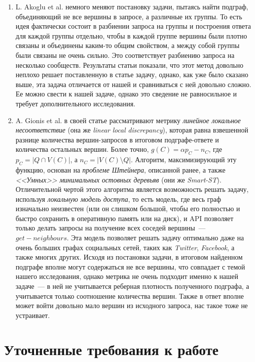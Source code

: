 \begin{enumerate}
  \item L. Akoglu et al. \cite{Akoglu13} немного меняют постановку задачи, пытаясь найти подграф, объединяющий не все вершины в запросе, а различные их группы. То есть идея фактически состоит в разбиении запроса на группы и построения ответа для каждой группы отдельно, чтобы в каждой группе вершины были плотно связаны и объединены каким-то общим свойством, а между собой группы были связаны не очень сильно. Это соответствует разбиению запроса на несколько сообществ. Результаты статьи показали, что этот метод довольно неплохо решает поставленную в статье задачу, однако, как уже было сказано выше, эта задача отличается от нашей и сравниваться с ней довольно сложно. Ее можно свести к нашей задаче, однако это сведение не равносильное и требует дополнительного исследования.

  \item A. Gionis et al. \cite{Gionis15} в своей статье рассматривают метрику \textit{линейное локальное несоответствие} (она же \textit{linear local discrepancy}), которая равна взвешенной разнице количества вершин-запросов в итоговом подграфе-ответе и количества остальных вершин. Более точно, $g(C) = \alpha p_C - n_C$, где $p_C = |Q \cap V(C)|$, а $n_C = |V(C) \setminus Q|$. Алгоритм, максимизирующий эту функцию, основан на \textit{проблеме Штейнера}, описанной ранее, а также \textit{<<Умных>> минимальных остовных деревьяв} (они же \textit{Smart-ST}). Отличительной чертой этого алгоритма является возможность решать задачу, используя \textit{локальную модель доступа}, то есть модель, где весь граф изначально неизвестен (или он слишком большой, чтобы его полностью и быстро сохранить в оперативную память или на диск), и API позволяет только делать запросы на получение всех соседей вершины~--- $get-neighbours$. Эта модель позволяет решать задачу оптимально даже на очень больших графах социальных сетей, таких как \textit{Twitter}, \textit{Facebook}, а также многих других. Исходя из постановки задачи, в итоговом найденном подграфе вполне могут содержаться не все вершины, что совпадает с темой нашего исследования, однако метрика не очень подходит именно к нашей задаче~--- в ней не учитывается реберная плотность полученного подграфа, а учитывается только соотношение количества вершин. Также в ответ вполне может войти довольно мало вершин из исходного запроса, нас такое тоже не устраивает.
\end{enumerate}

\section{Уточненные требования к работе}

